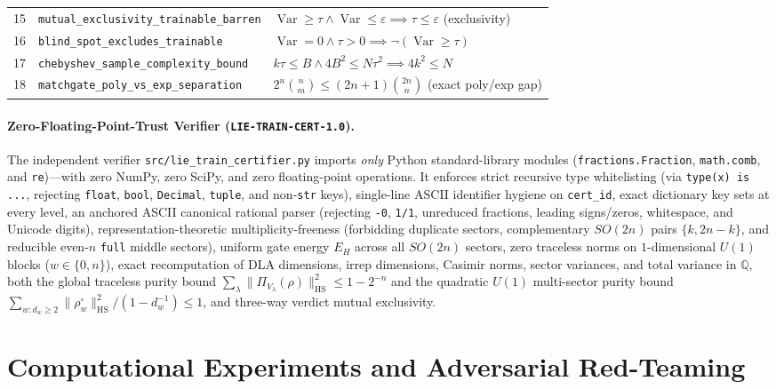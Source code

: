 \documentclass[11pt,a4paper]{article}
\theoremstyle{definition}
\theoremstyle{remark}
\newcommand{\QQ}{\mathbb{Q}}
\newcommand{\Var}{\operatorname{Var}}
\newcommand{\HS}{\mathrm{HS}}
\newcommand{\certschema}{\texttt{LIE-TRAIN-CERT-1.0}}
\begin{document}
\begin{table}[t]
\begin{tabular}{@{}rll@{}}
15 & \texttt{mutual\_exclusivity\_trainable\_barren} & $\Var \ge \tau \wedge \Var \le \varepsilon \implies \tau \le \varepsilon$ (exclusivity) \\
16 & \texttt{blind\_spot\_excludes\_trainable} & $\Var = 0 \wedge \tau > 0 \implies \neg(\Var \ge \tau)$ \\
17 & \texttt{chebyshev\_sample\_complexity\_bound} & $k\tau \le B \wedge 4B^2 \le N\tau^2 \implies 4k^2 \le N$ \\
18 & \texttt{matchgate\_poly\_vs\_exp\_separation} & $2^n\binom{n}{m} \le (2n+1)\binom{2n}{n}$ (exact poly/exp gap) \\
\bottomrule
\end{tabular}
\end{table}

\paragraph{Zero-Floating-Point-Trust Verifier (\certschema{}).}
The independent verifier \texttt{src/lie\_\allowbreak train\_\allowbreak certifier.py} imports \emph{only} Python standard-library modules (\texttt{fractions.\allowbreak Fraction}, \texttt{math.comb}, and \texttt{re})---with zero NumPy, zero SciPy, and zero floating-point operations. It enforces strict recursive type whitelisting (via \texttt{type(x) is ...}, rejecting \texttt{float}, \texttt{bool}, \texttt{Decimal}, \texttt{tuple}, and non-\texttt{str} keys), single-line ASCII identifier hygiene on \texttt{cert\_id}, exact dictionary key sets at every level, an anchored ASCII canonical rational parser (rejecting \texttt{-0}, \texttt{1/1}, unreduced fractions, leading signs/zeros, whitespace, and Unicode digits), representation-theoretic multiplicity-freeness (forbidding duplicate sectors, complementary $SO(2n)$ pairs $\{k, 2n-k\}$, and reducible even-$n$ \texttt{full} middle sectors), uniform gate energy $E_H$ across all $SO(2n)$ sectors, zero traceless norms on $1$-dimensional $U(1)$ blocks ($w \in \{0, n\}$), exact recomputation of DLA dimensions, irrep dimensions, Casimir norms, sector variances, and total variance in $\QQ$, both the global traceless purity bound $\sum_\lambda \|\Pi_{V_\lambda}(\rho)\|_{\HS}^2 \le 1 - 2^{-n}$ and the quadratic $U(1)$ multi-sector purity bound $\sum_{w: d_w \ge 2} \|\rho_w^\circ\|_{\HS}^2 / (1 - d_w^{-1}) \le 1$, and three-way verdict mutual exclusivity.

\section{Computational Experiments and Adversarial Red-Teaming}
\end{document}
